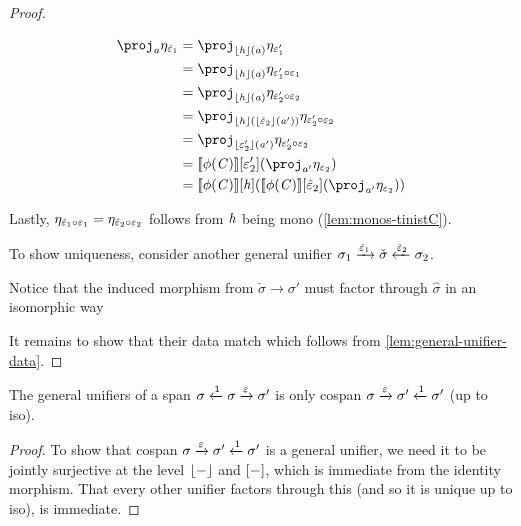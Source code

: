 \begin{proof}
\begin{enumerate}
\begin{align*}
                  \proj_\va \mvarM_{\hat\me_1} &= \proj_{\concL\vh(\va)} \mvarM_{\me_1'} \\
                                               &= \proj_{\concL\vh(\va)} \mvarM_{\me_1' \comp \me_1} \\
                                               &= \proj_{\concL\vh(\va)} \mvarM_{\me_2' \comp \me_2} \\
                                               &= \proj_{\concL\vh(\concL{\hat\me_2}(\va'))} \mvarM_{\me_2' \comp \me_2} \\
                                               &= \proj_{\concL{\me_2'}(\va')} \mvarM_{\me_2' \comp \me_2} \\
                                               &= \sem{\phi(\vC)}\anyL{\me_2'}(\proj_{\va'} \mvarM_{\me_2}) \\
                                               &= \sem{\phi(\vC)}\anyL\vh(\sem{\phi(\vC)}\anyL{\hat\me_2}(\proj_{\va'} \mvarM_{\me_2}))
              \end{align*}

              Lastly, $\eta_{\hat{\varepsilon}_1 \circ \varepsilon_1} = \eta_{\hat{\varepsilon}_2 \circ \varepsilon_2}$ follows from $\mathit{h}$ being mono (\cref{lem:monos-tinistC}).
    \end{enumerate}
    To show uniqueness, consider another general unifier $\sigma_1 \xrightarrow{\check{\varepsilon}_1} \check\sigma \xleftarrow{\check{\varepsilon}_2} \sigma_2$.

    Notice that the induced morphism from $\check\sigma \to \sigma'$ must factor through $\hat\sigma$ in an isomorphic way
    \begin{center}
    \end{center}
    It remains to show that their data match which follows from \cref{lem:general-unifier-data}.
\end{proof}

\begin{lemma}\label{lem:general-unifier-id}
    The general unifiers of a span $\sigma \xleftarrow{1} \sigma \xrightarrow{\varepsilon} \sigma'$ is only cospan $\sigma \xrightarrow{\varepsilon} \sigma' \xleftarrow{1} \sigma'$ (up to iso).
\end{lemma}
\begin{proof}
    To show that cospan $\sigma \xrightarrow{\varepsilon} \sigma' \xleftarrow{1} \sigma'$ is a general unifier, we need it to be jointly surjective at the level $\lfloor-\rfloor$ and $[-]$, which is immediate from the identity morphism.
    That every other unifier factors through this (and so it is unique up to iso), is immediate.
\end{proof}

